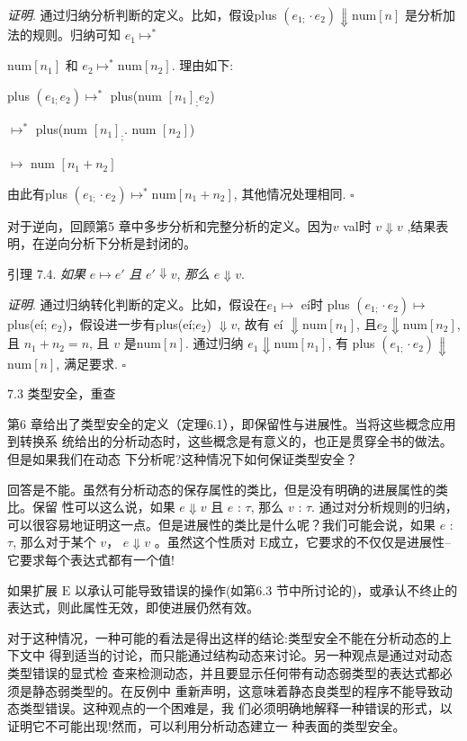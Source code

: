 {\it 证明}. 通过归纳分析判断的定义。比如，假设plus $(e_{1;}\cdot e_{2}) \Downarrow \mathrm{n}\mathrm{u}\mathrm{m}[n]$ 是分析加法的规则。归纳可知 $e_{1} \mapsto^{*}$

$\mathrm{n}\mathrm{u}\mathrm{m}[n_{1}]$ 和 $e_{2}\mapsto^{*}\mathrm{n}\mathrm{u}\mathrm{m}[n_{2}]$. 理由如下:

plus $(e_{1;}e_{2}) \mapsto^{*}$ plus(num $[n_{1}]_{;}e_{2}$)

$\mapsto^{*}$ plus(num $[n_{1}]_{;}$. num $[n_{2}]$)

$\mapsto$ num $[n_{1}+n_{2}]$

由此有plus $(e_{1;}\cdot e_{2}) \mapsto^{*}\mathrm{n}\mathrm{u}\mathrm{m}[n_{1}+n_{2}]$, 其他情况处理相同. $\square $

对于逆向，回顾第5 章中多步分析和完整分析的定义。因为$v$ val时 $v\Downarrow v$ ,结果表明，在逆向分析下分析是封闭的。

引理 7.4. {\it 如果} $e\mapsto e'$ {\it 且} $e'\Downarrow v$, {\it 那么} $e\Downarrow v.$

{\it 证明}. 通过归纳转化判断的定义。比如，假设在$e_{1} \mapsto$ e\'{i}时 plus $(e_{1;}\cdot e_{2}) \mapsto$plus(e\'{i}; $e_{2}$)，假设进一步有plus(e\'{i};$e_{2}$) $\Downarrow v$, 故有 e\'{i} $\Downarrow \mathrm{n}\mathrm{u}\mathrm{m}[n_{1}]$, 且$e_{2}\Downarrow \mathrm{n}\mathrm{u}\mathrm{m}[n_{2}]$, 且 $n_{1}+n_{2}=n$, 且 $v$ 是$\mathrm{n}\mathrm{u}\mathrm{m}[n]$. 通过归纳 $e_{1}\Downarrow \mathrm{n}\mathrm{u}\mathrm{m}[n_{1}]$, 有 plus $(e_{1;}\cdot e_{2})\Downarrow$
$\mathrm{n}\mathrm{u}\mathrm{m}[n]$, 满足要求. $\square $

7.3 类型安全，重查

第6 章给出了类型安全的定义（定理6.1），即保留性与进展性。当将这些概念应用到转换系
统给出的分析动态时，这些概念是有意义的，也正是贯穿全书的做法。但是如果我们在动态
下分析呢?这种情况下如何保证类型安全？

回答是不能。虽然有分析动态的保存属性的类比，但是没有明确的进展属性的类比。保留
性可以这么说，如果 $e \Downarrow v$ 且 $e$ : $\tau$, 那么 $v$ : $\tau$. 通过对分析规则的归纳，可以很容易地证明这一点。但是进展性的类比是什么呢？我们可能会说，如果 $e$ : $\tau$, 那么对于某个 $v$， $e\Downarrow v$ 。虽然这个性质对 $\mathrm{E}$成立，它要求的不仅仅是进展性--它要求每个表达式都有一个值!

如果扩展 $\mathrm{E}$ 以承认可能导致错误的操作(如第6.3 节中所讨论的)，或承认不终止的表达式，则此属性无效，即使进展仍然有效。

对于这种情况，一种可能的看法是得出这样的结论:类型安全不能在分析动态的上下文中
得到适当的讨论，而只能通过结构动态来讨论。另一种观点是通过对动态类型错误的显式检
查来检测动态，并且要显示任何带有动态弱类型的表达式都必须是静态弱类型的。在反例中
重新声明，这意味着静态良类型的程序不能导致动态类型错误。这种观点的一个困难是，我
们必须明确地解释一种错误的形式，以证明它不可能出现!然而，可以利用分析动态建立一
种表面的类型安全。

